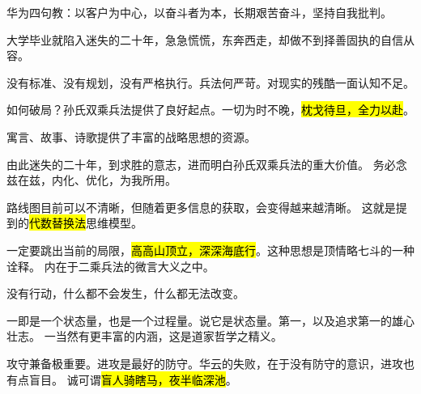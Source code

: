 \hrulefill

华为四句教：以客户为中心，以奋斗者为本，长期艰苦奋斗，坚持自我批判。

\hrulefill

大学毕业就陷入迷失的二十年，急急慌慌，东奔西走，却做不到择善固执的自信从容。

没有标准、没有规划，没有严格执行。兵法何严苛。对现实的残酷一面认知不足。

如何破局？孙氏双乘兵法提供了良好起点。一切为时不晚，\hl{枕戈待旦，全力以赴}。

寓言、故事、诗歌提供了丰富的战略思想的资源。

由此迷失的二十年，到求胜的意志，进而明白孙氏双乘兵法的重大价值。
务必念兹在兹，内化、优化，为我所用。

路线图目前可以不清晰，但随着更多信息的获取，会变得越来越清晰。
这就是提到的\hl{代数替换法}思维模型。

一定要跳出当前的局限，\hl{高高山顶立，深深海底行}。这种思想是顶情略七斗的一种诠释。
内在于二乘兵法的微言大义之中。

没有行动，什么都不会发生，什么都无法改变。

一即是一个状态量，也是一个过程量。说它是状态量。第一，以及追求第一的雄心壮志。
一当然有更丰富的内涵，这是道家哲学之精义。

攻守兼备极重要。进攻是最好的防守。华云的失败，在于没有防守的意识，进攻也有点盲目。
诚可谓\hl{盲人骑瞎马，夜半临深池}。
